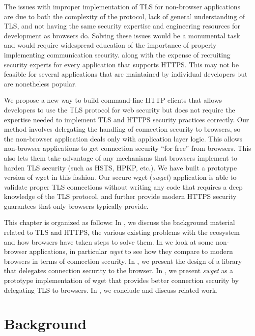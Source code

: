The issues with improper implementation of TLS for non-browser applications are
due to both the complexity of the protocol, lack of general understanding of
TLS, and not having the same security expertise and engineering resources for
development as browsers do. Solving these issues would be a monumental task and
would require widespread education of the importance of properly implementing
communication security. along with the expense of recruiting security experts
for every application that supports HTTPS. This may not be feasible for several
applications that are maintained by individual developers but are nonetheless
popular.

We propose a new way to build command-line HTTP clients that allows developers
to use the TLS protocol for web security but does not require the expertise
needed to implement TLS and HTTPS security practices correctly. Our method
involves delegating the handling of connection security to browsers, so the
non-browser application deals only with application layer logic. This allows
non-browser applications to get connection security ``for free'' from browsers.
This also lets them take advantage of any mechanisms that browsers implement to
harden TLS security (such as HSTS, HPKP, etc.). We have built a prototype
version of wget in this fashion. Our secure wget (\emph{swget}) application is
able to validate proper TLS connections without writing any code that requires
a deep knowledge of the TLS protocol, and further provide modern HTTPS security
guarantees that only browsers typically provide.

This chapter is organized as follows: In , we
discuss the background material related to TLS and HTTPS, the various existing
problems with the ecosystem and how browsers have taken steps to solve them. In
 we look at some non-browser applications, in
particular \emph{wget} to see how they compare to modern browsers in terms of
connection security. In , we present the design of a
library that delegates connection security to the browser. In
, we present \emph{swget} as a prototype implementation
of wget that provides better connection security by delegating TLS to browsers.
In , we conclude and discuss related work.


\section{Background}
\label{sec:background-saber}

